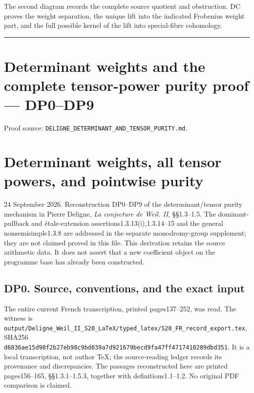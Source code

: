 \documentclass[
]{report}
\begin{document}
The second diagram records the complete source quotient and obstruction.
DC proves the weight separation, the unique lift into the indicated
Frobenius weight part, and the full possible kernel of the lift into
special-fibre cohomology.

\begin{center}\rule{0.5\linewidth}{0.5pt}\end{center}

\chapter{Determinant weights and the complete tensor-power purity proof
---
DP0--DP9}\label{determinant-weights-and-the-complete-tensor-power-purity-proof-dp0dp9}

Proof source: \nolinkurl{DELIGNE_DETERMINANT_AND_TENSOR_PURITY.md}.

\chapter{Determinant weights, all tensor powers, and pointwise
purity}\label{determinant-weights-all-tensor-powers-and-pointwise-purity}

24 September 2026. Reconstruction DP0--DP9 of the determinant/tensor
purity mechanism in Pierre Deligne, \emph{La conjecture de Weil. II},
§§1.3--1.5. The dominant-pullback and étale-extension
assertions1.3.13(i),1.3.14--15 and the general nonsemisimple1.3.8 are
addressed in the separate monodromy-group supplement; they are not
claimed proved in this file. This derivation retains the source
arithmetic data. It does not assert that a new coefficient object on the
programme base has already been constructed.

\section{DP0. Source, conventions, and the exact
input}\label{dp0.-source-conventions-and-the-exact-input}

The entire current French transcription, printed pages137--252, was
read. The witness is
\nolinkurl{output/Deligne_Weil_II_S20_LaTeX/typed_latex/S20_FR_record_export.tex},
SHA256
\nolinkurl{d6836ae15d98f2b27eb98c9bd039a7d921679becd9fa47ff4717410289dbd351}.
It is a local transcription, not author TeX; the source-reading ledger
records its provenance and discrepancies. The passages reconstructed
here are printed pages156--165, §§1.3.1--1.5.3, together with
definitions1.1--1.2. No original PDF comparison is claimed.
\end{document}
